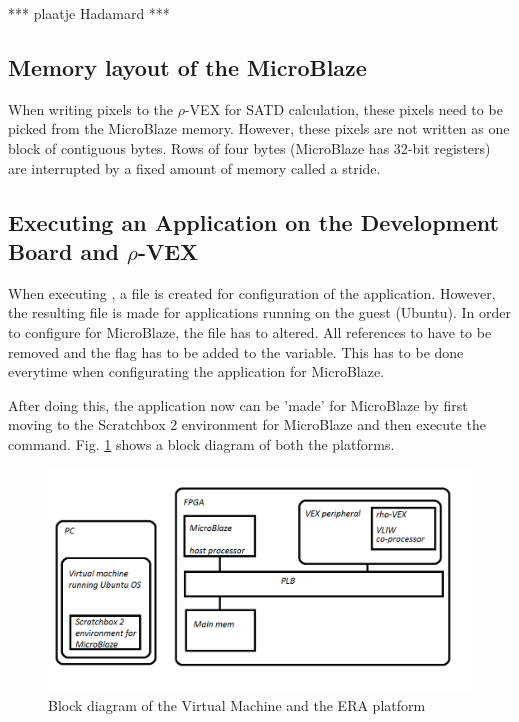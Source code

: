 *** plaatje Hadamard ***

\subsection{Memory layout of the MicroBlaze}
\label{sec:layout}
When writing pixels to the $\rho$-VEX for SATD calculation, these pixels need to be picked from the MicroBlaze memory. However, these pixels are not written as one block of contiguous bytes. Rows of four bytes (MicroBlaze has 32-bit registers) are interrupted by a fixed amount of memory called a stride.

\subsection{Executing an Application on the Development Board and $\rho$-VEX}
\label{sec:executing}
When executing , a file is created for configuration of the application. However, the resulting  file is made for applications running on the guest (Ubuntu). In order to configure for MicroBlaze, the  file has to altered. All references to  have to be removed and the  flag has to be added to the  variable. This has to be done everytime when configurating the application for MicroBlaze.

After doing this, the application now can be 'made' for MicroBlaze by first moving to the Scratchbox 2 environment for MicroBlaze and then execute the  command. Fig. \ref{fig:lelijk} shows a block diagram of both the platforms.

\begin{figure}[htb]%
\includegraphics[width=\columnwidth]{Pictures/Platform_paint}%
\caption{Block diagram of the Virtual Machine and the ERA platform}%
\label{fig:lelijk}%
\end{figure}

